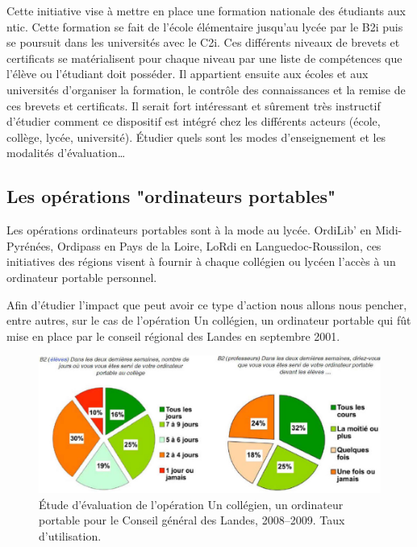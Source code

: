 Cette initiative vise à mettre en place une formation nationale des
étudiants aux \gls{ntic}\cite{b2i_c2i}. Cette formation se fait de l'école élémentaire
jusqu'au lycée par le B2i puis se poursuit dans les universités avec
le C2i. Ces différents niveaux de brevets et certificats se
matérialisent pour chaque niveau par une liste de compétences que
l'élève ou l'étudiant doit posséder. Il appartient ensuite aux écoles
et aux universités d'organiser la formation, le contrôle des
connaissances et la remise de ces brevets et certificats. Il serait
fort intéressant et sûrement très instructif d'étudier comment ce
dispositif est intégré chez les différents acteurs (école, collège,
lycée, université). Étudier quels sont les modes d'enseignement et
les modalités d'évaluation\ldots

\subsection{Les opérations "ordinateurs portables"}

Les opérations \og{}ordinateurs portables\fg{} sont à la mode au
lycée. OrdiLib' en Midi-Pyrénées, Ordipass en Pays de la Loire, LoRdi
en Languedoc-Roussilon, ces initiatives des régions visent à fournir à
chaque collégien ou lycéen l'accès à un ordinateur portable personnel.

Afin d'étudier l'impact que peut avoir ce type d'action nous allons
nous pencher, entre autres, sur le cas de l'opération \og{}Un collégien, un
ordinateur portable\fg{} qui fût mise en place par le conseil régional
des Landes en septembre 2001\cite{portables40}. 

\begin{figure}[h]
	\begin{center}
		\includegraphics[width=\textwidth]{../resources/illustrations/usage_portables_without_caption}
	\caption{Étude d'évaluation de l'opération \og Un collégien,
          un ordinateur portable \fg{} pour le Conseil général des
          Landes, 2008--2009. Taux d'utilisation.}
		\label{fig:graph_op_portables}
        \end{center}
\end{figure}

